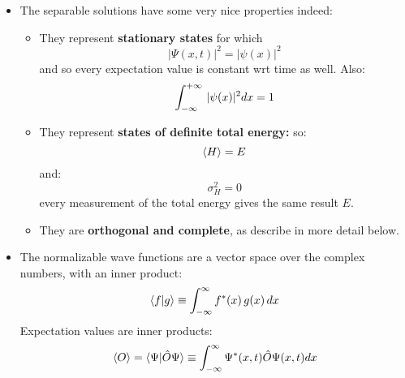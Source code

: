 \documentclass[12pt]{article}
\begin{document}
\begin{itemize}
\item The separable solutions have some very nice properties indeed:
\begin{itemize}
\item They represent {\bf stationary states} for which
$$|\Psi(x,t)|^2 = | \psi(x) |^2$$
and so every expectation value is constant wrt time as well.  Also:
\begin{equation*}
\int_{-\infty}^{+\infty}\, |\psi(x)|^2 dx = 1\\
\end{equation*}
\item They represent {\bf states of definite total energy:} so:
$$\braket{H} = E$$
and:
$$\sigma^2_H = 0$$
every measurement of the total energy gives the same result $E$.
\item They are {\bf orthogonal and complete}, as describe in more detail below.
\end{itemize}

\item The normalizable wave functions are a vector space over the complex numbers, with an inner product:
\begin{equation}
\braket{f|g} \equiv \int_{-\infty}^{\infty} f^*(x) \, g(x) \, dx
\end{equation}
Expectation values are inner products:
\begin{equation}
\braket{O} = \braket{\Psi|\hat{O}\Psi} \equiv \int_{-\infty}^{\infty} \Psi^*(x,t)\hat{O}\Psi(x,t) dx
\end{equation}


\end{itemize}
\end{document}
